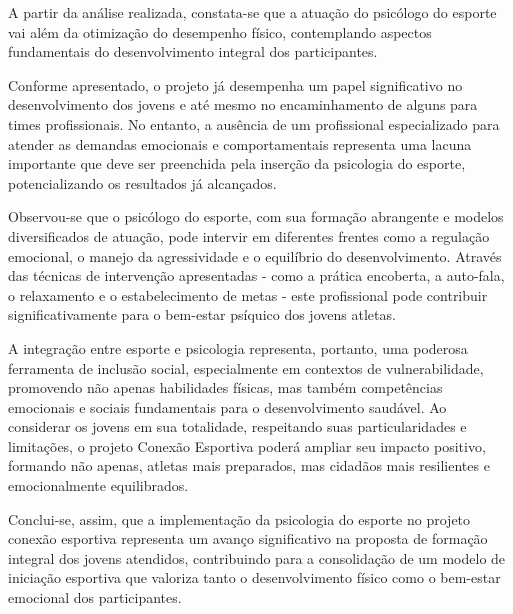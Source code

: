 \begin{Conclusao} %
A partir da análise realizada, constata-se que a atuação do psicólogo do esporte vai além da otimização do desempenho físico, contemplando aspectos fundamentais do desenvolvimento integral dos participantes.

Conforme apresentado, o projeto já desempenha um papel significativo no desenvolvimento dos jovens e até mesmo no encaminhamento de alguns para times profissionais. No entanto, a ausência de um profissional especializado para atender as demandas emocionais e comportamentais representa uma lacuna importante que deve ser preenchida pela inserção da psicologia do esporte, potencializando os resultados já alcançados.

Observou-se que o psicólogo do esporte, com sua formação abrangente e modelos diversificados de atuação, pode intervir em diferentes frentes como a regulação emocional, o manejo da agressividade e o equilíbrio do desenvolvimento. Através das técnicas de intervenção apresentadas - como a prática encoberta, a auto-fala, o relaxamento e o estabelecimento de metas - este profissional pode contribuir significativamente para o bem-estar psíquico dos jovens atletas.

A integração entre esporte e psicologia representa, portanto, uma poderosa ferramenta de inclusão social, especialmente em contextos de vulnerabilidade, promovendo não apenas habilidades físicas, mas também competências emocionais e sociais fundamentais para o desenvolvimento saudável. Ao considerar os jovens em sua totalidade, respeitando suas particularidades e limitações, o projeto Conexão Esportiva poderá ampliar seu impacto positivo, formando não apenas, atletas mais preparados, mas cidadãos mais resilientes e emocionalmente equilibrados.

Conclui-se, assim, que a implementação da psicologia do esporte no projeto conexão esportiva representa um avanço significativo na proposta de formação integral dos jovens atendidos, contribuindo para a consolidação de um modelo de iniciação esportiva que valoriza tanto o desenvolvimento físico como o bem-estar emocional dos participantes.
\end{Conclusao}